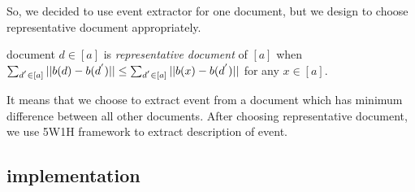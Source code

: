 So, we decided to use event extractor for one document, but we design to choose
representative document appropriately.

\begin{definition}
    document $d \in [a]$ is \textit{representative document} of $[a]$ when
    $\sum_{d^{'} \in [a]} ||b(d) - b(d^{'})|| \\ \leq \sum_{d^{'} \in [a]} ||b(x) - b(d^{'})||$ 
    for any $x \in [a]$.
\end{definition}

It means that we choose to extract event from a document which has
minimum difference between all other documents. After choosing representative
document, we use 5W1H framework to extract description of event.

\subsection{implementation}